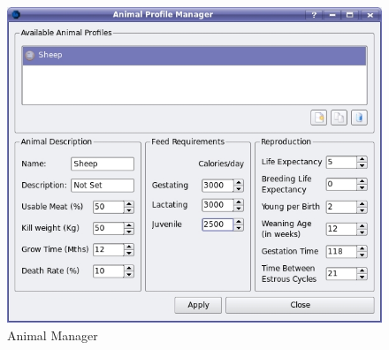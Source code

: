 \begin{figure}[htbp]
  \includegraphics[scale=.39]{./images/animalManager.jpg}
  \caption{\label{fig:animalManager}Animal Manager}
\end{figure}


